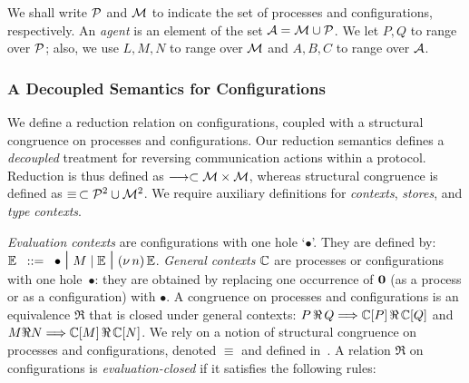 \documentclass[runningheads]{llncs}
\begin{document}
\noindent
We shall write $\mathcal{P}$ and $\mathcal{M}$ to indicate the set of processes and configurations, respectively. 
An \emph{agent} is an element of the set $\mathcal{A} = \mathcal{M} \cup \mathcal{P}$. 
We let $P, Q$  to range over $\mathcal{P}$; also, we use $L,M,N$ to range over $\mathcal{M}$ and $A,B,C$ to range over $\mathcal{A}$.





\subsubsection{A Decoupled Semantics for Configurations}\label{ss:semconf}
We define a reduction relation on configurations, coupled with a structural congruence
 on processes and configurations.
Our reduction semantics defines a \emph{decoupled} treatment for reversing communication actions within a protocol.
Reduction is thus defined as $\longrightarrow \subset \mathcal{M} \times \mathcal{M}$, whereas structural congruence is defined as $\equiv\, \subset \mathcal{P}^{2} \cup \mathcal{M}^{2}$.  We require auxiliary definitions for \emph{contexts}, \emph{stores}, and \emph{type contexts}.

\emph{Evaluation contexts} are configurations with one hole 
 `$\bullet$'. They are  defined by:
$\mathbb{E}\;\;::=\;\; \bullet \;\mbox{\Large{$\mid$}}\; M\;|\; \mathbb{E} \;\mbox{\Large{$\mid$}}\; (\nu\, n)\, \mathbb{E}$. 
\emph{General contexts} $\mathbb{C}$ are processes or configurations with one hole~$\bullet$: they are obtained  by replacing one occurrence of $\mathbf{0}$ (as a process or as a configuration) with $\bullet$.
A congruence on processes and configurations is an equivalence  $\Re$ that is closed under general contexts: $P \,\Re\,  Q \Longrightarrow \mathbb{C}[P]\,\Re\,  \mathbb{C}[Q]$
and $M\Re N \Longrightarrow \mathbb{C}[M]\,\Re\,  \mathbb{C}[N]$.
We rely on a notion of structural congruence on processes and configurations, denoted $\equiv$ and defined in~\cite{DBLP:conf/ppdp/MezzinaP17}.
A relation $\Re$ on configurations is \emph{evaluation-closed} if it satisfies the   following rules:
\end{document}
